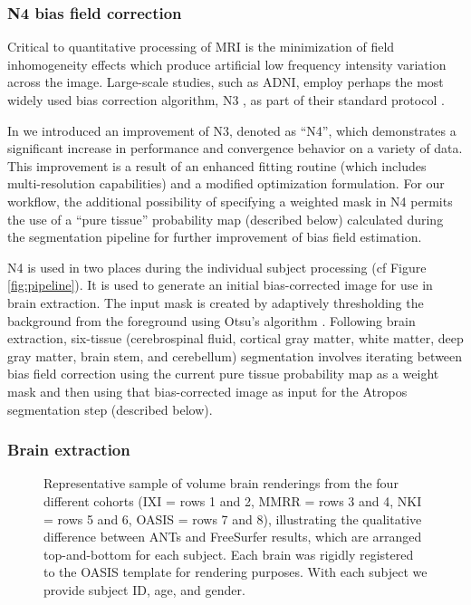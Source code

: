 \subsubsection{N4 bias field correction}

Critical to quantitative processing of MRI is the minimization of
field inhomogeneity effects which produce artificial low frequency 
intensity variation across the image.  Large-scale studies, such
as ADNI, employ
perhaps the most widely used bias correction algorithm, N3 \citep{sled1998}, 
as part of their standard protocol \citep{boyes2008}.

In \cite{tustison2010} we introduced an improvement of N3, denoted as
``N4'', which demonstrates a significant increase in performance and convergence behavior on a variety of data. 
This improvement is a result of an enhanced
fitting routine (which includes multi-resolution capabilities) and a modified optimization 
formulation.  For our workflow, the additional possibility of specifying
a weighted mask in N4 permits the use of a ``pure tissue'' probability map 
(described below)
calculated during the segmentation pipeline for further improvement of 
bias field estimation.  

N4 is used in two places during the individual subject processing (cf Figure
\ref{fig:pipeline}).  
It is used to generate an initial bias-corrected image for use in
brain extraction.  The input mask is created by adaptively thresholding 
the background from the foreground using Otsu's algorithm \citep{otsu1979}.
Following brain extraction, six-tissue (cerebrospinal fluid, cortical gray 
matter, white matter, deep gray matter, brain stem, and cerebellum)
segmentation involves iterating
between bias field correction using the current pure tissue 
probability map as a weight mask and then using that bias-corrected image
as input for the Atropos segmentation step (described below).

\subsubsection{Brain extraction}

\begin{figure}
  \vspace{0mm}
  \caption{Representative sample of volume brain renderings from the four
  different cohorts (IXI = rows 1 and 2, MMRR = rows 3 and 4, 
  NKI = rows 5 and 6, OASIS = rows 7 and 8),
  illustrating the qualitative difference between ANTs and FreeSurfer 
  results, which are arranged top-and-bottom for each subject.  Each brain was rigidly
  registered to the OASIS template for rendering purposes.  With each subject
  we provide subject ID, age, and gender.
  }
  \label{fig:brainExtraction}
\end{figure}


